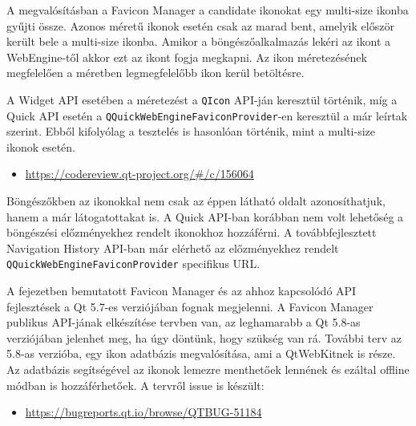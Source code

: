 \documentclass[12pt]{report}
\let\origurl\url
\renewcommand{\url}[1]{%
    \textcolor{blue}{\origurl{#1}}
}
\newcommand{\gerrit}[1]{%
    \textcolor{qtgreen}{\origurl{https://codereview.qt-project.org/\#/c/#1}}
}
\newcommand{\qtbug}[1]{%
    \textcolor{qtred}{\origurl{https://bugreports.qt.io/browse/QTBUG-#1}}
}
\begin{document}
A megvalósításban a Favicon Manager a candidate ikonokat egy multi-size ikonba gyűjti össze.
Azonos méretű ikonok esetén csak az marad bent, amelyik először került bele a multi-size
ikonba. Amikor a böngészőalkalmazás lekéri az ikont a WebEngine-től akkor ezt az ikont
fogja megkapni. Az ikon méretezésének megfelelően a méretben legmegfelelőbb ikon kerül
betöltésre.

A Widget API esetében a méretezést a \texttt{QIcon} API-ján keresztül történik, míg a
Quick API esetén a \texttt{QQuickWebEngineFaviconProvider}-en keresztül a már leírtak
szerint. Ebből kifolyólag a tesztelés is hasonlóan történik, mint a multi-size ikonok
esetén.

\begin{center}
    \begin{reviewbox}
        \begin{itemize}
            \renewcommand{\labelitemi}{\textcolor{qtgreen}{$\blacktriangleright$}}
            \item \gerrit{156064}
        \end{itemize}
    \end{reviewbox}
\end{center}

Böngészőkben az ikonokkal nem csak az éppen látható oldalt azonosíthatjuk, hanem a már
látogatottakat is. A Quick API-ban korábban nem volt lehetőség a böngészési előzményekhez
rendelt ikonokhoz hozzáférni. A továbbfejlesztett Navigation History API-ban már elérhető
az előzményekhez rendelt \texttt{QQuickWebEngineFaviconProvider} specifikus URL.

A fejezetben bemutatott Favicon Manager és az ahhoz kapcsolódó API fejlesztések a Qt 5.7-es
verziójában fognak megjelenni. A Favicon Manager publikus API-jának elkészítése tervben van,
az leghamarabb a Qt 5.8-as verziójában jelenhet meg, ha úgy döntünk, hogy szükség van rá.
További terv az 5.8-as verzióba, egy ikon adatbázis megvalósítása, ami a QtWebKitnek is
része. Az adatbázis segítségével az ikonok lemezre menthetőek lennének és ezáltal offline
módban is hozzáférhetőek. A tervről issue is készült:
\begin{center}
    \begin{issuebox}
        \begin{itemize}
            \renewcommand{\labelitemi}{\textcolor{qtred}{$\blacktriangleright$}}
            \item \qtbug{51184}
        \end{itemize}
    \end{issuebox}
\end{center}
\end{document}
